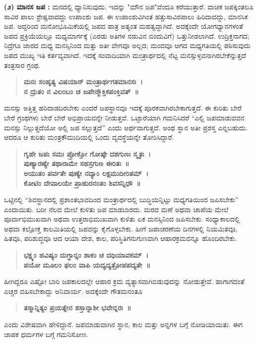 \textbf{(೨) ಮಾನಸ ಜಪ :} ಮನದಲ್ಲಿ ಧ್ಯಾನಿಸುವುದು. ಇದನ್ನು "ಮೌನ ಜಪ"ವೆಂದೂ ಕರೆಯುತ್ತಾರೆ. ವಾಚಿಕ ಜಪಕ್ಕಿಂತಲೂ ಸಾವಿರ ಪಾಲು ಶ್ರೇಷ್ಟವಾದದ್ದು ಉಪಾಂಶು ಜಪ. ಈ ಉಪಾಂಶುವಿಗಿಂತ ಹತ್ತುಸಾವಿರಪಾಲು ಹಿರಿದಾದದ್ದು, ಮಾನಸಿಕ ಜಪ. ಆದ್ದರಿಂದ ಮನೋಭೂಮಿಕೆಯಲ್ಲಿ ಜಪದ ಪಾತ್ರ ಅತ್ಯಂತ ಮಹತ್ವದ್ದಾಗಿದೆ. ಅದಕ್ಕೆಂದೇ ಯೋಗಧ್ಯಾನಗಳಂತೆ ಜಪದ ಪ್ರಕ್ರಿಯೆಯಲ್ಲೂ ಮಧ್ಯಮಾರ್ಗಕ್ಕೆ (ಎರಡು ಅತಿಗಳ ನಡುವಿನ ಬಿಂದುವಿಗೆ) ಒತ್ತುನೀಡಲಾಗಿದೆ. ಉದ್ರಿಕ್ತನಾಗದ; ನಿದ್ರೆಗೂ ಜಾರದ ಮಧ್ಯ ಮನಸ್ಸಿನಿಂದ ಮತ್ತು ಅತೀ ವೇಗವೂ ಅಲ್ಲದ; ಮಂದವೂ ಆಗದ ಮಧ್ಯಗತಿಯಲ್ಲಿ ಪಠಿಸುವುದು ಜಪದ ಮುಖ್ಯ ಇತಿ ಕರ್ತವ್ಯವಾಗಿದೆ. ಇದಕ್ಕೆ ಸಂವಾದಿಯಾಗಿ ಮಂತ್ರಾರ್ಥದಲ್ಲಿ ನೆಟ್ಟ ಮನಸ್ಸುಳ್ಳವನಾಗಿರಬೇಕೆನ್ನುತ್ತದೆ ತಂತ್ರಸಾರ ಗ್ರಂಥ.
\begin{verse}
\textbf{ಮನಃ ಸಂಹೃತ್ಯ ವಿಷಯಾನ್ ಮಂತ್ರಾರ್ಥಗತಮಾನಸಃ~। \\
ನ ದ್ರುತಂ ನ ವಿಲಂಬಂ ಚ ಜಪೇನ್ಮೌಕ್ತಿಕಪಂಕ್ತಿವತ್~॥}
\end{verse}
ಮನಸ್ಸು ಅತ್ತಿತ್ತ ಹರಿದಾಡದಿರಬೇಕು ಎಂದರೆ ಜಪಸ್ಥಾನವೂ ಇದಕ್ಕೆ ಪೂರಕವಾಗಿರಬೇಕಾಗುತ್ತದೆ. ಈ ಕುರಿತು ಬೇರೆ ಬೇರೆ ಗ್ರಂಥಗಳು ಬೇರೆ ಬೇರೆ ಅಭಿಪ್ರಾಯವನ್ನೇ ನೀಡುತ್ತವೆ. ಒಟ್ಟಾರೆಯಾಗಿ ಗಮನಿಸಿದರೆ “ಎಲ್ಲಿ ಜಪಮಾಡುವವನ ಮನಸ್ಸು ನಿಲ್ಲುತ್ತದೆಯೋ ಅಲ್ಲಿ ಜಪ ಸಲ್ಲುತ್ತದೆ” ಎಂದು ಅರ್ಥವಾಗುತ್ತದೆ. ಅಂಥ ಸ್ಥಾನ ಅತೀ ಪ್ರಶಸ್ತ ಎನ್ನಬಹುದು. ಆದರೂ ಆ ಕುರಿತು ಮಂತ್ರಕೌಮುದಿಯಲ್ಲಿ ಒಂದು ವ್ಯವಸ್ಥೆಯನ್ನೇ ತೋರಿಸಿದ್ದಾರೆ.
\begin{verse}
\textbf{ಗೃಹೇ ಜಪಃ ಸಮಃ ಪ್ರೋಕ್ತೋ ಗೋಷ್ಠೇ ದಶಗುಣಃ ಸ್ಮೃತಃ~। \\
ಪುಣ್ಯಾರಣ್ಯೇ ತಥಾರಾಮೇ ಸಹಸ್ರಗುಣ ಈರಿತಃ~॥\\
ಅಯುತಂ ಪರ್ವತೇ ಪುಣ್ಯೇ ನದ್ಯಾಂ ಲಕ್ಷಮುದೀರಿತಮ್~। \\
ಕೋಟಿಂ ದೇವಾಲಯೇ ಪ್ರಾಹುರನಂತಂ ಶಿವಸನ್ನಿಧೌ~॥}
\end{verse}
ಒಟ್ಟಿನಲ್ಲಿ “ಶಿವಸ್ಥಾನದಲ್ಲಿ ಪ್ರಶಾಂತಭಾವದಿಂದ ಮಂತ್ರಾರ್ಥದಲ್ಲಿ ಬುದ್ಧಿಯನ್ನಿಟ್ಟು ಮಧ್ಯಗತಿಯಿಂದ ಜಪಿಸಬೇಕು” ಎಂದಾಯಿತು. ಬರೀ ನೆಲದ ಮೇಲೆ ಕುಳಿತು ಜಪ ಮಾಡಬಾರದು. ಮರದ ಮಣೆ ಅಥವಾ ಚಾಪೆಯ ಮೇಲೆ ಪೂರ್ವಾಭಿಮುಖವಾಗಿ ಅಥವಾ ಉತ್ತರಾಭಿಮುಖವಾಗಿ ಕುಳಿತು ಏಕ ಮನಸ್ಸಿನಿಂದ ಜಪಿಸಬೇಕು. ಸಂಧ್ಯಾಕಾಲದಲ್ಲಿ ಅಥವಾ ಕಲ್ಪೋಕ್ತ ಕಾಲಮಿತಿಯಲ್ಲಿ ಜಪವನ್ನು ಕೈಗೊಳ್ಳಬೇಕು. ಹೀಗೆ ಜಪಾಚರಣೆಯ ದಿನಗಳಲ್ಲಿ ನಿಯಮಿತವೂ, ಹಿತವೂ, ಪರಿಶುದ್ಧವೂ ಆದ ಆಯಾ ದೇಶ, ಕಾಲ, ಪರಿಸ್ಥಿತಿಗನುಗುಣವಾಗಿ ಆಹಾರಕ್ರಮವನ್ನೂ ಹೊಂದಿರಬೇಕು. 
\begin{verse}
\textbf{ಭಕ್ಷ್ಯಂ ಹವಿಷ್ಯಂ ದುಗ್ಧಾನ್ನಂ ಶಾಕಂ ಚ ದಧಿಯಾವಕಮ್~। \\
ಪಯೋ ಮೂಲಂ ಫಲಂ ವಾಪಿ ಯದ್ಯದ್ಯತ್ರೋಪಪದ್ಯತೇ~॥}
\end{verse}
ಹೀಗಿದ್ದರೂ ಎಷ್ಟೋ ಬಾರಿ ಜಪಕಾಲದಲ್ಲೇ ಆಹಾರ ಕ್ರಮ ವ್ಯತ್ಯಾಸವಾಗಿಬಿಡುವುದನ್ನು ನೋಡುತ್ತೇವೆ. ಹಾಗಾಗದಂತೆ ಎಚ್ಚರ ವಹಿಸಬೇಕಾದ್ದು ಅನಿವಾರ್ಯ. ಅದಕ್ಕೆಂದೇ ಗೌತಮನಂತೂ 
\begin{verse}
\textbf{ತಸ್ಮಾನ್ನಿತ್ಯಂ ಪ್ರಯತ್ನೇನ ಶಸ್ತಾನ್ನಾಶೀ ಭವೇನ್ನರಃ~॥ }
\end{verse}
ಎಂದು ವಿಶೇಷವಾಗಿ ಹೇಳಿದ್ದಾನೆ. ಜಪಮಾಡುವಾಗಿನ ಸ್ಥಾನ, ಕಾಲ ಮತ್ತು ಅನ್ನಗಳ ಬಗ್ಗೆ ನೋಡಿಯಾಯಿತು. ಈಗ ಜಾಪಕ ಧರ್ಮಗಳ ಬಗ್ಗೆ ಗಮನಿಸೋಣ. 
